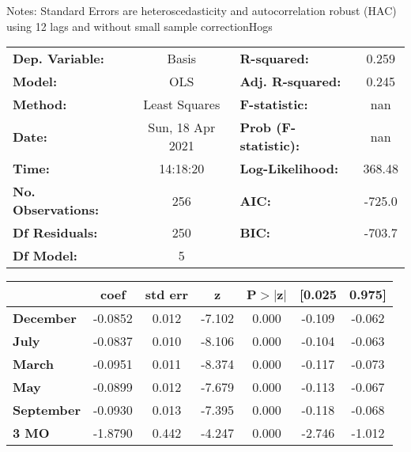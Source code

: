 Notes: \newline
 [1] Standard Errors are heteroscedasticity and autocorrelation robust (HAC) using 12 lags and without small sample correctionHogs\begin{center}
\begin{tabular}{lclc}
\toprule
\textbf{Dep. Variable:}    &      Basis       & \textbf{  R-squared:         } &     0.259   \\
\textbf{Model:}            &       OLS        & \textbf{  Adj. R-squared:    } &     0.245   \\
\textbf{Method:}           &  Least Squares   & \textbf{  F-statistic:       } &       nan   \\
\textbf{Date:}             & Sun, 18 Apr 2021 & \textbf{  Prob (F-statistic):} &      nan    \\
\textbf{Time:}             &     14:18:20     & \textbf{  Log-Likelihood:    } &    368.48   \\
\textbf{No. Observations:} &         256      & \textbf{  AIC:               } &    -725.0   \\
\textbf{Df Residuals:}     &         250      & \textbf{  BIC:               } &    -703.7   \\
\textbf{Df Model:}         &           5      & \textbf{                     } &             \\
\bottomrule
\end{tabular}
\begin{tabular}{lcccccc}
                   & \textbf{coef} & \textbf{std err} & \textbf{z} & \textbf{P$> |$z$|$} & \textbf{[0.025} & \textbf{0.975]}  \\
\midrule
\textbf{December}  &      -0.0852  &        0.012     &    -7.102  &         0.000        &       -0.109    &       -0.062     \\
\textbf{July}      &      -0.0837  &        0.010     &    -8.106  &         0.000        &       -0.104    &       -0.063     \\
\textbf{March}     &      -0.0951  &        0.011     &    -8.374  &         0.000        &       -0.117    &       -0.073     \\
\textbf{May}       &      -0.0899  &        0.012     &    -7.679  &         0.000        &       -0.113    &       -0.067     \\
\textbf{September} &      -0.0930  &        0.013     &    -7.395  &         0.000        &       -0.118    &       -0.068     \\
\textbf{3 MO}      &      -1.8790  &        0.442     &    -4.247  &         0.000        &       -2.746    &       -1.012     \\

\end{tabular}
\end{center}
